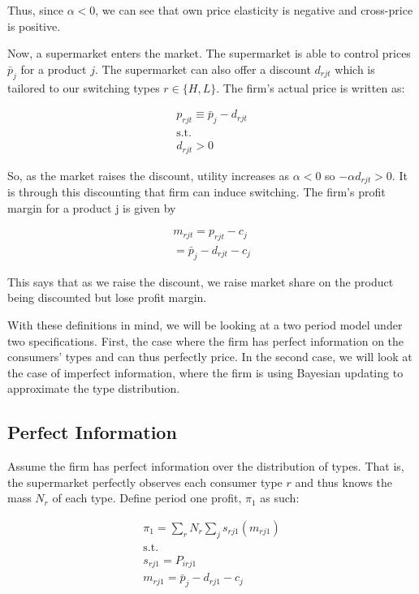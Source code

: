 \documentclass[11pt]{article}
\theoremstyle{definition}
\theoremstyle{remark}
\begin{document}
Thus, since $\alpha<0$, we can see that own price elasticity is negative and
cross-price is positive. 

Now, a supermarket enters the market. The supermarket is able to control prices
$\bar{p}_j$ for a product $j$. The supermarket can also offer a discount
$d_{rjt}$ which is tailored to our switching types $r\in\{H,L\}$. The firm's
actual price is written as:

\begin{gather*}
  p_{rjt} \equiv \bar{p}_j - d_{rjt} \\
  \text{s.t.} \\
  d_{rjt}>0
\end{gather*}

So, as the market raises the discount, utility increases as $\alpha<0$ so $-\alpha d_{rjt}>0$. It is through this discounting that firm can induce switching. The firm's profit margin for a product j is given by

\begin{gather*}
  m_{rjt} = p_{rjt} - c_j \\
  = \bar{p}_j - d_{rjt} - c_j
\end{gather*}

This says that as we raise the discount, we raise market share on the product being discounted but lose profit margin. 

With these definitions in mind, we will be looking at a two period model under two specifications. First, the case where the firm has perfect information on the consumers' types and can thus perfectly price. In the second case, we will look at the case of imperfect information, where the firm is using Bayesian updating to approximate the type distribution.

\subsection{Perfect Information}

Assume the firm has perfect information over the distribution of types. That is, the supermarket perfectly observes each consumer type $r$ and thus knows the mass $N_r$ of each type. Define period one profit, $\pi_1$ as such:

\begin{gather*}
  \pi_1 = \sum_rN_r\sum_js_{rj1}(m_{rj1}) \\
  \text{s.t.} \\
  s_{rj1} = P_{irj1} \\
  m_{rj1} = \bar{p}_j - d_{rj1} - c_j
\end{gather*}
\end{document}
